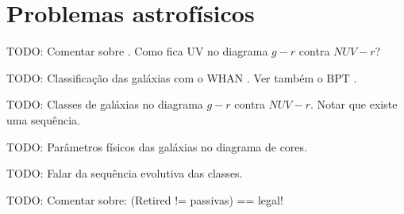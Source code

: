 



\chapter{Problemas astrofísicos}
\label{sec:Problemas}

TODO: Comentar sobre \citet{Chilingarian2011}. Como fica UV no diagrama
$g-r$ contra $NUV-r$?

TODO: Classificação das galáxias com o WHAN \citep{CidFernandes2011}. Ver também
o BPT \citep{CidFernandes2010}.

TODO: Classes de galáxias no diagrama $g-r$ contra $NUV-r$. Notar que existe uma
sequência.

TODO: Parâmetros físicos das galáxias no diagrama de cores.

TODO: Falar da sequência evolutiva das classes.

TODO: Comentar sobre: (Retired != passivas) == legal!


